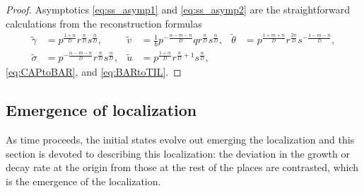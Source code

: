 \documentclass[a4paper,11pt]{article}
\def\tg{{\tilde{\gamma}}}
\def\tv{{\tilde{v}}}
\def\tth{{\tilde{\theta}}}
\def\ts{{\tilde{\sigma}}}
\def\tu{{\tilde{u}}}
\theoremstyle{remark}
\begin{document}
\begin{proof}
Asymptotics \eqref{eq:ss_asymp1} and \eqref{eq:ss_asymp2} are the straightforward calculations from the reconstruction formulas
\begin{align*}
 \tg&=p^{\frac{1+\alpha}{D}}r^{\frac{n}{D}}s^{\frac{\alpha}{D}}, & \tv &= \frac{1}{b} p^{-\frac{\alpha-m-n}{D}}qr^{\frac{n}{D}}s^{\frac{\alpha}{D}}, & \tth&=p^{\frac{1+m+n}{D}}r^{\frac{2n}{D}}s^{-\frac{1-m-n}{D}}, \\ \ts&=p^{-\frac{\alpha-m-n}{D}}r^{\frac{n}{D}}s^{\frac{\alpha}{D}},  & \tu&=p^{\frac{1+\alpha}{D}}r^{\frac{n}{D}+1}s^{\frac{\alpha}{D}},
\end{align*}
\eqref{eq:CAPtoBAR}, and \eqref{eq:BARtoTIL}.
%
%
%
\end{proof}

\subsection{Emergence of localization}
As time proceeds, the initial states evolve out emerging the localization and this section is devoted to describing this localization: the deviation in the growth or decay rate at the origin from those at the rest of the places are contrasted, which is the emergence of the localization.
\end{document}
